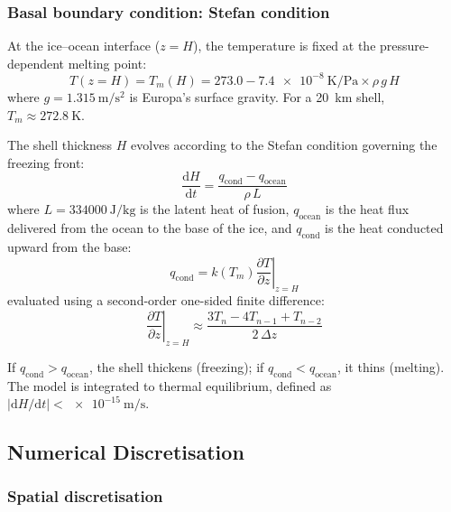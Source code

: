 \documentclass[11pt,a4paper]{article}
\newcommand{\dd}{\mathrm{d}}
\newcommand{\pp}{\partial}
\begin{document}
\subsubsection{Basal boundary condition: Stefan condition}

At the ice--ocean interface ($z = H$), the temperature is fixed at the
pressure-dependent melting point:
\begin{equation}
T(z=H) = T_m(H) = 273.0 - \SI{7.4e-8}{\kelvin\per\pascal}
  \times \rho\,g\,H
\label{eq:melt}
\end{equation}
where $g = \SI{1.315}{\metre\per\second\squared}$ is Europa's surface
gravity. For a \SI{20}{\kilo\metre} shell, $T_m \approx \SI{272.8}{\kelvin}$.

The shell thickness $H$ evolves according to the Stefan condition
governing the freezing front:
\begin{equation}
\frac{\dd H}{\dd t}
  = \frac{q_{\mathrm{cond}} - q_{\mathrm{ocean}}}{\rho\, L}
\label{eq:stefan}
\end{equation}
where $L = \SI{334000}{\joule\per\kilo\gram}$ is the latent heat of
fusion, $q_{\mathrm{ocean}}$ is the heat flux delivered from the ocean
to the base of the ice, and $q_{\mathrm{cond}}$ is the heat conducted
upward from the base:
\begin{equation}
q_{\mathrm{cond}} = k(T_m)\left.\frac{\pp T}{\pp z}\right|_{z=H}
\label{eq:qcond}
\end{equation}
evaluated using a second-order one-sided finite difference:
\begin{equation}
\left.\frac{\pp T}{\pp z}\right|_{z=H}
  \approx \frac{3T_n - 4T_{n-1} + T_{n-2}}{2\,\Delta z}
\label{eq:grad}
\end{equation}

If $q_{\mathrm{cond}} > q_{\mathrm{ocean}}$, the shell thickens
(freezing); if $q_{\mathrm{cond}} < q_{\mathrm{ocean}}$, it thins
(melting). The model is integrated to thermal equilibrium, defined as
$|\dd H/\dd t| < \SI{e-15}{\metre\per\second}$.

\subsection{Numerical Discretisation}
\label{sec:numerics}

\subsubsection{Spatial discretisation}
\end{document}
